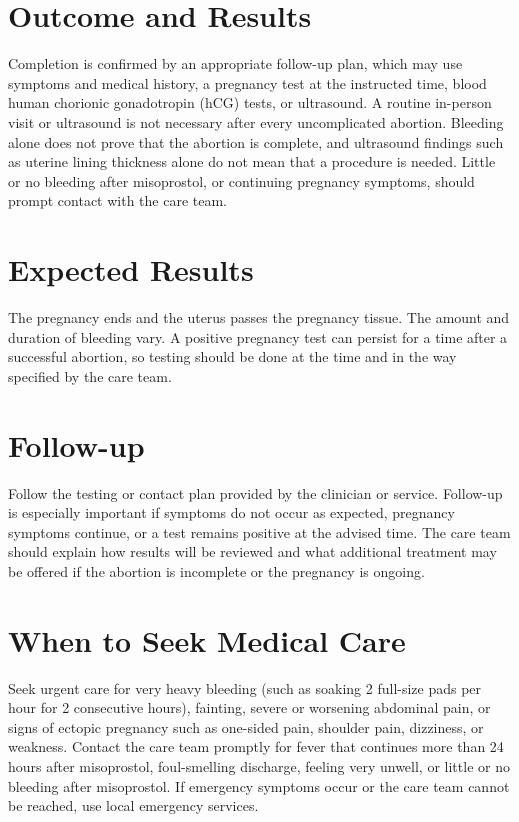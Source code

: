 \section*{Outcome and Results}
Completion is confirmed by an appropriate follow-up plan, which may use symptoms and medical history, a pregnancy test at the instructed time, blood human chorionic gonadotropin (hCG) tests, or ultrasound. A routine in-person visit or ultrasound is not necessary after every uncomplicated abortion. Bleeding alone does not prove that the abortion is complete, and ultrasound findings such as uterine lining thickness alone do not mean that a procedure is needed. Little or no bleeding after misoprostol, or continuing pregnancy symptoms, should prompt contact with the care team.

\section*{Expected Results}
The pregnancy ends and the uterus passes the pregnancy tissue. The amount and duration of bleeding vary. A positive pregnancy test can persist for a time after a successful abortion, so testing should be done at the time and in the way specified by the care team.

\section*{Follow-up}
Follow the testing or contact plan provided by the clinician or service. Follow-up is especially important if symptoms do not occur as expected, pregnancy symptoms continue, or a test remains positive at the advised time. The care team should explain how results will be reviewed and what additional treatment may be offered if the abortion is incomplete or the pregnancy is ongoing.

\section*{When to Seek Medical Care}
Seek urgent care for very heavy bleeding (such as soaking 2 full-size pads per hour for 2 consecutive hours), fainting, severe or worsening abdominal pain, or signs of ectopic pregnancy such as one-sided pain, shoulder pain, dizziness, or weakness. Contact the care team promptly for fever that continues more than 24 hours after misoprostol, foul-smelling discharge, feeling very unwell, or little or no bleeding after misoprostol. If emergency symptoms occur or the care team cannot be reached, use local emergency services.

